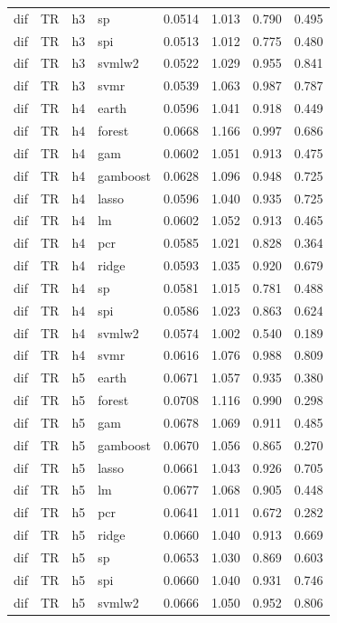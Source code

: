 \begin{ThreePartTable}
\begin{longtable}[t]{llclcccc}
dif & TR & h3 & sp & 0.0514 & 1.013 & 0.790 & 0.495\\
dif & TR & h3 & spi & 0.0513 & 1.012 & 0.775 & 0.480\\
dif & TR & h3 & svmlw2 & 0.0522 & 1.029 & 0.955 & 0.841\\
dif & TR & h3 & svmr & 0.0539 & 1.063 & 0.987 & 0.787\\
\addlinespace
dif & TR & h4 & earth & 0.0596 & 1.041 & 0.918 & 0.449\\
dif & TR & h4 & forest & 0.0668 & 1.166 & 0.997 & 0.686\\
dif & TR & h4 & gam & 0.0602 & 1.051 & 0.913 & 0.475\\
dif & TR & h4 & gamboost & 0.0628 & 1.096 & 0.948 & 0.725\\
dif & TR & h4 & lasso & 0.0596 & 1.040 & 0.935 & 0.725\\
dif & TR & h4 & lm & 0.0602 & 1.052 & 0.913 & 0.465\\
dif & TR & h4 & pcr & 0.0585 & 1.021 & 0.828 & 0.364\\
dif & TR & h4 & ridge & 0.0593 & 1.035 & 0.920 & 0.679\\
dif & TR & h4 & sp & 0.0581 & 1.015 & 0.781 & 0.488\\
dif & TR & h4 & spi & 0.0586 & 1.023 & 0.863 & 0.624\\
dif & TR & h4 & svmlw2 & 0.0574 & 1.002 & 0.540 & 0.189\\
dif & TR & h4 & svmr & 0.0616 & 1.076 & 0.988 & 0.809\\
\addlinespace
dif & TR & h5 & earth & 0.0671 & 1.057 & 0.935 & 0.380\\
dif & TR & h5 & forest & 0.0708 & 1.116 & 0.990 & 0.298\\
dif & TR & h5 & gam & 0.0678 & 1.069 & 0.911 & 0.485\\
dif & TR & h5 & gamboost & 0.0670 & 1.056 & 0.865 & 0.270\\
dif & TR & h5 & lasso & 0.0661 & 1.043 & 0.926 & 0.705\\
dif & TR & h5 & lm & 0.0677 & 1.068 & 0.905 & 0.448\\
dif & TR & h5 & pcr & 0.0641 & 1.011 & 0.672 & 0.282\\
dif & TR & h5 & ridge & 0.0660 & 1.040 & 0.913 & 0.669\\
dif & TR & h5 & sp & 0.0653 & 1.030 & 0.869 & 0.603\\
dif & TR & h5 & spi & 0.0660 & 1.040 & 0.931 & 0.746\\
dif & TR & h5 & svmlw2 & 0.0666 & 1.050 & 0.952 & 0.806\\

\end{longtable}
\end{ThreePartTable}
